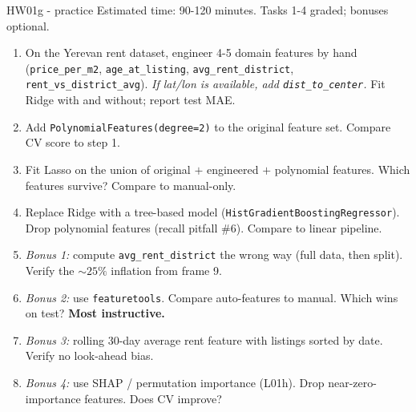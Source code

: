 \documentclass[aspectratio=169]{beamer}
\begin{document}
\begin{frame}{HW01g - practice}
  \footnotesize Estimated time: 90-120 minutes. Tasks 1-4 graded; bonuses optional.
  \begin{enumerate}\footnotesize
    \item On the Yerevan rent dataset, engineer 4-5 domain features by hand (\texttt{price\_per\_m2}, \texttt{age\_at\_listing}, \texttt{avg\_rent\_district}, \texttt{rent\_vs\_district\_avg}). \emph{If lat/lon is available, add \texttt{dist\_to\_center}.} Fit Ridge with and without; report test MAE.
    \item Add \texttt{PolynomialFeatures(degree=2)} to the original feature set. Compare CV score to step 1.
    \item Fit Lasso on the union of original $+$ engineered $+$ polynomial features. Which features survive? Compare to manual-only.
    \item Replace Ridge with a tree-based model (\texttt{HistGradientBoostingRegressor}). Drop polynomial features (recall pitfall \#6). Compare to linear pipeline.
    \item \emph{Bonus 1:} compute \texttt{avg\_rent\_district} the wrong way (full data, then split). Verify the $\sim 25\%$ inflation from frame 9.
    \item \emph{Bonus 2:} use \texttt{featuretools}. Compare auto-features to manual. Which wins on test? \textbf{Most instructive.}
    \item \emph{Bonus 3:} rolling 30-day average rent feature with listings sorted by date. Verify no look-ahead bias.
    \item \emph{Bonus 4:} use SHAP / permutation importance (L01h). Drop near-zero-importance features. Does CV improve?
  \end{enumerate}
\end{frame}
\end{document}
